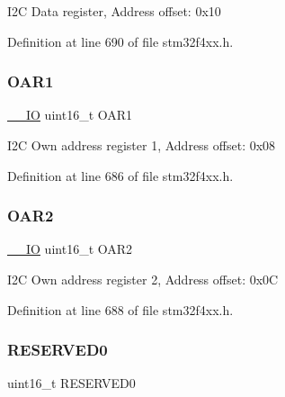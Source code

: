 I2C Data register, Address offset\+: 0x10 

Definition at line 690 of file stm32f4xx.\+h.

\mbox{\label{struct_i2_c___type_def_aaab934113da0a8bcacd1ffa148046569}} 
\subsubsection{\texorpdfstring{O\+A\+R1}{OAR1}}
{\footnotesize\ttfamily \hyperlink{group___c_m_s_i_s__core__definitions_gaec43007d9998a0a0e01faede4133d6be}{\+\_\+\+\_\+\+IO} uint16\+\_\+t O\+A\+R1}

I2C Own address register 1, Address offset\+: 0x08 

Definition at line 686 of file stm32f4xx.\+h.

\mbox{\label{struct_i2_c___type_def_a692c0f6e38cde9ec1c3c50c36aa79817}} 
\subsubsection{\texorpdfstring{O\+A\+R2}{OAR2}}
{\footnotesize\ttfamily \hyperlink{group___c_m_s_i_s__core__definitions_gaec43007d9998a0a0e01faede4133d6be}{\+\_\+\+\_\+\+IO} uint16\+\_\+t O\+A\+R2}

I2C Own address register 2, Address offset\+: 0x0C 

Definition at line 688 of file stm32f4xx.\+h.

\mbox{\label{struct_i2_c___type_def_a149feba01f9c4a49570c6d88619f504f}} 
\subsubsection{\texorpdfstring{R\+E\+S\+E\+R\+V\+E\+D0}{RESERVED0}}
{\footnotesize\ttfamily uint16\+\_\+t R\+E\+S\+E\+R\+V\+E\+D0}

